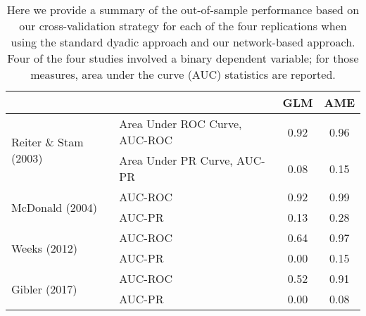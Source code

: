 \begin{table}[ht]
\centering
	\begin{tabular}{l|l cc}
	~ & ~ & GLM & AME \\
	\toprule
		\multirow{2}{*}{Reiter \& Stam (2003)} & Area Under ROC Curve, AUC-ROC & 0.92 & {0.96} \\
				~ & Area Under PR Curve, AUC-PR & 0.08 &  {0.15} \\		\midrule
		\multirow{2}{*}{McDonald (2004)} & AUC-ROC & 0.92 &  {0.99} \\
				~ & AUC-PR & 0.13 &  {0.28} \\		\midrule
		\multirow{2}{*}{Weeks (2012)} & AUC-ROC & 0.64 &  {0.97} \\
				~ & AUC-PR & 0.00 &  {0.15} \\		\midrule
		\multirow{2}{*}{Gibler (2017)} & AUC-ROC & 0.52 &  {0.91} \\
				~ & AUC-PR & 0.00 &  {0.08} \\			\bottomrule
	\end{tabular}
	\caption{Here we provide a summary of the out-of-sample performance based on our cross-validation strategy for each of the four replications when using the standard dyadic approach and our network-based approach. Four of the four studies involved a binary dependent variable; for those measures, area under the curve (AUC) statistics are reported.\tabularnewline
	}
	\label{tab:modelPerfSumm}
\end{table}
\FloatBarrier

